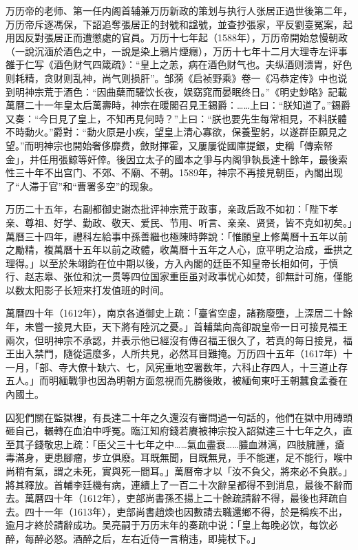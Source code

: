 万历帝的老师、第一任内阁首辅兼万历新政的策划与执行人张居正過世後第二年，万历帝斥逐馮保，下詔追奪張居正的封號和諡號，並查抄張家，平反劉臺冤案，起用因反對張居正而遭懲處的官員。万历十七年起（1588年），万历帝開始怠慢朝政（一說沉湎於酒色之中，一說是染上鴉片煙癮），万历十七年十二月大理寺左评事雒于仁写《酒色财气四箴疏》：“皇上之恙，病在酒色财气也。夫纵酒则溃胃，好色则耗精，贪财则乱神，尚气则损肝”。邹漪《启祯野乘》卷一《冯恭定传》中也说到明神宗荒于酒色：“因曲蘖而驩饮长夜，娱窈窕而晏眠终日。”《明史鈔略》記載萬曆二十一年皇太后萬壽時，神宗在暖閣召見王錫爵：……上曰：“朕知道了。”錫爵又奏：“今日見了皇上，不知再見何時？”上曰：“朕也要先生每常相見，不料朕體不時動火。”爵對：“動火原是小疾，望皇上清心寡欲，保養聖躬，以遂群臣願見之望。”而明神宗也開始奢侈靡费，斂財揮霍，又屢屢從國庫提銀，史稱「傳索帑金」，并任用張鯨等奸倖。後因立太子的國本之爭与内阁爭執長達十餘年，最後索性三十年不出宫门、不郊、不廟、不朝。1589年，神宗不再接見朝臣，內閣出现了“人滞于官”和“曹署多空”的现象。

万历二十五年，右副都御史謝杰批评神宗荒于政事，亲政后政不如初：「陛下孝亲、尊祖、好学、勤政、敬天、爱民、节用、听言、亲亲、贤贤，皆不克如初矣。」萬曆三十四年，禮科左給事中孫善繼也極陳時弊說：「惟願皇上修萬曆十五年以前之勵精，複萬曆十五年以前之政體，收萬曆十五年之人心，庶平明之治成，垂拱之理得。」以至於朱翊鈞在位中期以後，方入內閣的廷臣不知皇帝长相如何，于慎行、赵志皋、张位和沈一贯等四位国家重臣虽对政事忧心如焚，卻無計可施，僅能以数太阳影子长短来打发值班的时间。

萬曆四十年（1612年），南京各道御史上疏：「臺省空虛，諸務廢墮，上深居二十餘年，未嘗一接見大臣，天下將有陸沉之憂。」首輔葉向高卻說皇帝一日可接見福王兩次，但明神宗不承認，并表示他已經沒有傳召福王很久了，若真的每日接見，福王出入禁門，隨從這麼多，人所共見，必然耳目難掩。万历四十五年（1617年）十一月，「部、寺大僚十缺六、七，风宪重地空署数年，六科止存四人，十三道止存五人。」而明緬戰爭也因為明朝方面忽視而先勝後敗，被緬甸東吁王朝蠶食孟養在內國土。

囚犯們關在監獄裡，有長達二十年之久還沒有審問過一句話的，他們在獄中用磚頭砸自己，輾轉在血泊中呼冤。臨江知府錢若賡被神宗投入詔獄達三十七年之久，直至其子錢敬忠上疏：「臣父三十七年之中……氣血盡衰……膿血淋漓，四肢臃腫，瘡毒滿身，更患腳瘤，步立俱廢。耳既無聞，目既無見，手不能運，足不能行，喉中尚稍有氣，謂之未死，實與死一間耳。」萬曆帝才以「汝不負父，將來必不負朕。」將其釋放。首輔李廷機有病，連續上了一百二十次辭呈都得不到消息，最後不辭而去。萬曆四十年（1612年），吏部尚書孫丕揚上二十餘疏請辭不得，最後也拜疏自去。四十一年（1613年），吏部尚書趙煥也因數請去職還鄉不得，於是稱疾不出，逾月才終於請辭成功。吴亮嗣于万历末年的奏疏中说：「皇上每晚必饮，每饮必醉，每醉必怒。酒醉之后，左右近侍一言稍违，即毙杖下。」

